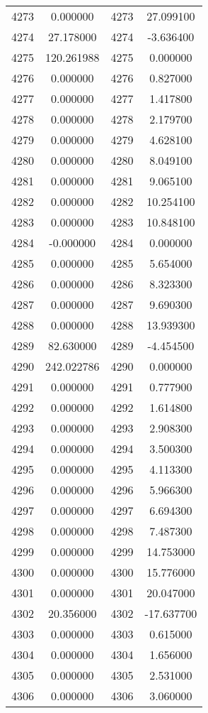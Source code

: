 \documentclass[12pt]{article}
\begin{document}
\begin{longtable}{@{}cccc@{}}
4273 & 0.000000 & 4273 & 27.099100 \\
4274 & 27.178000 & 4274 & -3.636400 \\
4275 & 120.261988 & 4275 & 0.000000 \\
4276 & 0.000000 & 4276 & 0.827000 \\
4277 & 0.000000 & 4277 & 1.417800 \\
4278 & 0.000000 & 4278 & 2.179700 \\
4279 & 0.000000 & 4279 & 4.628100 \\
4280 & 0.000000 & 4280 & 8.049100 \\
4281 & 0.000000 & 4281 & 9.065100 \\
4282 & 0.000000 & 4282 & 10.254100 \\
4283 & 0.000000 & 4283 & 10.848100 \\
4284 & -0.000000 & 4284 & 0.000000 \\
4285 & 0.000000 & 4285 & 5.654000 \\
4286 & 0.000000 & 4286 & 8.323300 \\
4287 & 0.000000 & 4287 & 9.690300 \\
4288 & 0.000000 & 4288 & 13.939300 \\
4289 & 82.630000 & 4289 & -4.454500 \\
4290 & 242.022786 & 4290 & 0.000000 \\
4291 & 0.000000 & 4291 & 0.777900 \\
4292 & 0.000000 & 4292 & 1.614800 \\
4293 & 0.000000 & 4293 & 2.908300 \\
4294 & 0.000000 & 4294 & 3.500300 \\
4295 & 0.000000 & 4295 & 4.113300 \\
4296 & 0.000000 & 4296 & 5.966300 \\
4297 & 0.000000 & 4297 & 6.694300 \\
4298 & 0.000000 & 4298 & 7.487300 \\
4299 & 0.000000 & 4299 & 14.753000 \\
4300 & 0.000000 & 4300 & 15.776000 \\
4301 & 0.000000 & 4301 & 20.047000 \\
4302 & 20.356000 & 4302 & -17.637700 \\
4303 & 0.000000 & 4303 & 0.615000 \\
4304 & 0.000000 & 4304 & 1.656000 \\
4305 & 0.000000 & 4305 & 2.531000 \\
4306 & 0.000000 & 4306 & 3.060000 \\

\end{longtable}
\end{document}
